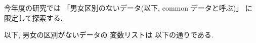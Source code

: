 %
%
%
%
%
%





{今年度の研究では
「男女区別のないデータ(以下, common データと呼ぶ)」
に限定して探索する.
}


以下, 男女の区別がないデータの
変数リストは
以下の通りである.

%
%
%
%
%







